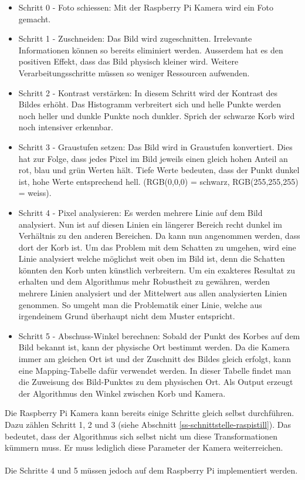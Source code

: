 \begin{itemize}
	\item Schritt 0 - Foto schiessen: Mit der Raspberry Pi Kamera wird ein Foto gemacht.
	
	\item Schritt 1 - Zuschneiden: Das Bild wird zugeschnitten. Irrelevante Informationen können so bereits eliminiert werden. Ausserdem hat es den positiven Effekt, dass das Bild physisch kleiner wird. Weitere Verarbeitungsschritte müssen so weniger Ressourcen aufwenden. 
	
	\item Schritt 2 - Kontrast verstärken: In diesem Schritt wird der Kontrast des Bildes erhöht. Das Histogramm verbreitert sich und helle Punkte werden noch heller und dunkle Punkte noch dunkler. Sprich der schwarze Korb wird noch intensiver erkennbar. 
	
	\item Schritt 3 - Graustufen setzen: Das Bild wird in Graustufen konvertiert. Dies hat zur Folge, dass jedes Pixel im Bild jeweils einen gleich hohen Anteil an rot, blau und grün Werten hält. Tiefe Werte bedeuten, dass der Punkt dunkel ist, hohe Werte entsprechend hell. (RGB(0,0,0) = schwarz, RGB(255,255,255) = weiss).
	
	\item Schritt 4 - Pixel analysieren: Es werden mehrere Linie auf dem Bild analysiert. Nun ist auf diesen Linien ein längerer Bereich recht dunkel im Verhältnis zu den anderen Bereichen. Da kann nun angenommen werden, dass dort der Korb ist. Um das Problem mit dem Schatten zu umgehen, wird eine Linie analysiert welche möglichst weit oben im Bild ist, denn die Schatten könnten den Korb unten künstlich verbreitern. Um ein exakteres Resultat zu erhalten und dem Algorithmus mehr Robustheit zu gewähren, werden mehrere Linien analysiert und der Mittelwert aus allen analysierten Linien genommen. So umgeht man die Problematik einer Linie, welche aus irgendeinem Grund überhaupt nicht dem Muster entspricht.
	
	\item Schritt 5 - Abschuss-Winkel berechnen: Sobald der Punkt des Korbes auf dem Bild bekannt ist, kann der physische Ort bestimmt werden. Da die Kamera immer am gleichen Ort ist und der Zuschnitt des Bildes gleich erfolgt, kann eine Mapping-Tabelle dafür verwendet werden. In dieser Tabelle findet man die Zuweisung des Bild-Punktes zu dem physischen Ort. Als Output erzeugt der Algorithmus den Winkel zwischen Korb und Kamera.
\end{itemize} 
Die Raspberry Pi Kamera kann bereits einige Schritte gleich selbst durchführen. Dazu zählen Schritt 1, 2 und 3 (siehe Abschnitt \ref{ss-schnittstelle-raspistill}). Das bedeutet, dass der Algorithmus sich selbst nicht um diese Transformationen kümmern muss. Er muss lediglich diese Parameter der Kamera weiterreichen.\\
\\
Die Schritte 4 und 5 müssen jedoch auf dem Raspberry Pi implementiert werden.

